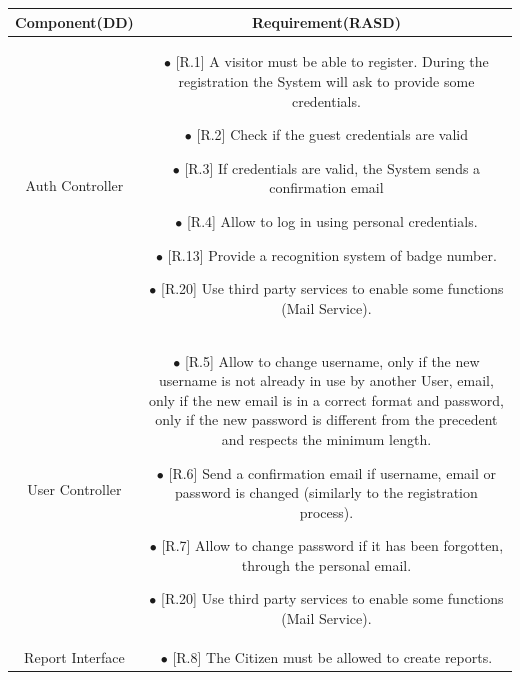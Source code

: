 \documentclass{report}
\begin{document}
\begin{tabularx}{\linewidth}{| c || c |}
    \hline
    \endfoot

    \hline
\textbf{Component(DD)} & \textbf{Requirement(RASD)}\\
	\hline
	\hline
    \large{Auth Controller} & \parbox{0.45\textwidth}{ \vspace{2mm}
    $\bullet$ {[R.1]} A visitor must be able to register. During the registration the System will ask to provide some credentials. \\

	$\bullet$ {[R.2]} Check if the guest credentials are valid \\

	$\bullet$ {[R.3]} If credentials are valid, the System sends a confirmation email \\

	$\bullet$ {[R.4]} Allow to log in using personal credentials. \\

    $\bullet$ {[R.13]} Provide a recognition system of badge number.\\
     
    $\bullet$ {[R.20]} Use third party services to enable some functions (Mail Service).\\}\\
        
    \hline
    \large{User Controller} & \parbox{0.45\textwidth}{ \vspace{2mm} 
    $\bullet$ {[R.5]} Allow to change username, only if the new username is not already in use by another User, email, only if the new email is in a correct format and password, only if the new password is different from the precedent and respects the minimum length. \\

	$\bullet$ {[R.6]} Send a confirmation email if username, email or password is changed (similarly to the registration process). \\

	$\bullet$ {[R.7]} Allow to change password if it has been forgotten, through the personal email. \\
    
    $\bullet$ {[R.20]} Use third party services to enable some functions (Mail Service).\\} \\

	\hline
    \large{Report Interface} & \parbox{0.45\textwidth}{ \vspace{2mm} 
    $\bullet$ {[R.8]} The Citizen must be allowed to create reports. \\} \\


\end{tabularx}
\end{document}
